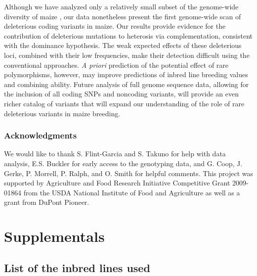\documentclass[12pt]{article}
\begin{document}
Although we have analyzed only a relatively small subset of the genome-wide diversity of maize \citep{Chia2012}, our data nonetheless present the first genome-wide scan of deleterious coding variants in maize.  Our results provide evidence for the contribution of deleterious mutations to heterosis via complementation, consistent with the dominance hypothesis. 
The weak expected effects of these deleterious loci, combined with their low frequencies, make their detection difficult using the conventional approaches. \emph{A priori} prediction of the potential effect of rare polymorphisms, however, may improve predictions of inbred line breeding values and combining ability. Future analysis of full genome sequence data, allowing for the inclusion of all coding SNPs and noncoding variants, will provide an even richer catalog of variants that will expand our understanding of the role of rare deleterious variants in maize breeding.

\subsubsection*{Acknowledgments}
We would like to thank S. Flint-Garcia and S. Takuno for help with data analysis, E.S. Buckler for early access to the genotyping data, and G. Coop, J. Gerke, P. Morrell, P. Ralph, and O. Smith for helpful comments. 
This project was supported by Agriculture and Food Research Initiative Competitive Grant 2009-01864 from the USDA National Institute of Food and Agriculture as well as a grant from DuPont Pioneer. 

\clearpage


\clearpage
\setcounter{figure}{0}
\setcounter{table}{0}
\renewcommand{\figurename}{Sup. Fig.}
\renewcommand{\tablename}{Sup. Table}


\section*{Supplementals}

\subsection*{List of the inbred lines used } 
\end{document}
